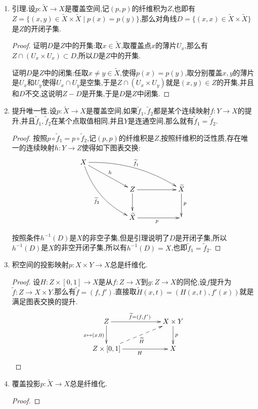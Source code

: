 \begin{enumerate}
	\item 引理.设$p:\widetilde{X}\to X$是覆盖空间,记$(p,p)$的纤维积为$Z$,也即有$Z=\{(x,y)\in\widetilde{X}\times\widetilde{X}\mid p(x)=p(y)\}$,那么对角线$D=\{(x,x)\in\widetilde{X}\times\widetilde{X}\}$是$Z$的开闭子集.
	\begin{proof}
		
		证明$D$是$Z$中的开集:取$x\in\widetilde{X}$,取覆盖点$x$的薄片$U_x$,那么有$Z\cap(U_x\times U_x)\subset D$,所以$D$是$Z$中的开集.
		
		\qquad
		
		证明$D$是$Z$中的闭集:任取$x\not=y\in\widetilde{X}$,使得$p(x)=p(y)$,取分别覆盖$x,y$的薄片是$U_x$和$U_y$使得$U_x\cap U_y$是空集,于是$Z\cap(U_x\times U_y)$就是$(x,y)\in Z$的开集,并且和$D$不交,这说明$Z-D$是开集,于是$D$是$Z$中闭集.
	\end{proof}
	\item 提升唯一性.设$p:\widetilde{X}\to X$是覆盖空间,如果$\widetilde{f}_1,\widetilde{f}_2$都是某个连续映射$f:Y\to X$的提升,并且$\widetilde{f}_1,\widetilde{f}_2$在某个点取值相同,并且$Y$是连通空间,那么就有$\widetilde{f}_1=\widetilde{f}_2$.
	\begin{proof}
		
		按照$p\circ\widetilde{f}_1=p\circ\widetilde{f}_2$,记$(p,p)$的纤维积是$Z$,按照纤维积的泛性质,存在唯一的连续映射$h:Y\to Z$使得如下图表交换:
		$$\xymatrix{X\ar@/^1pc/[drrrr]^{\widetilde{f}_1}\ar[drr]^{h}\ar@/_1pc/[ddrr]_{\widetilde{f}_2}&&&&\\&&Z\ar[rr]\ar[d]&&\widetilde{X}\ar[d]^p\\&&\widetilde{X}\ar[rr]_p&&}$$
		
		按照条件$h^{-1}(D)$是$X$的非空子集,但是引理说明了$D$是开闭子集,所以$h^{-1}(D)$是$X$的非空开闭子集,所以有$h^{-1}(D)=X$,也即$\widetilde{f}_1=\widetilde{f}_2$.
	\end{proof}
	\item 积空间的投影映射$p:X\times Y\to X$总是纤维化.
	\begin{proof}
		
		设$H:Z\times[0,1]\to X$是从$f:Z\to X$到$g:Z\to X$的同伦,设$f$提升为$\widetilde{f}:Z\to X\times Y$.那么有$\widetilde{f}=(f,f')$.直接取$\widetilde{H}(x,t)=(H(x,t),f'(x))$就是满足图表交换的提升.
		$$\xymatrix{Z\ar[rr]^{\widetilde{f}=(f,f')}\ar[d]_{x\mapsto(x,0)}&&X\times Y\ar[d]^p\\Z\times[0,1]\ar[rr]_H\ar@{-->}[urr]_{\widetilde{H}}&&X}$$
	\end{proof}
	\item 覆盖投影$p:\widetilde{X}\to X$总是纤维化.
	\begin{proof}
		

\end{proof}
\end{enumerate}
